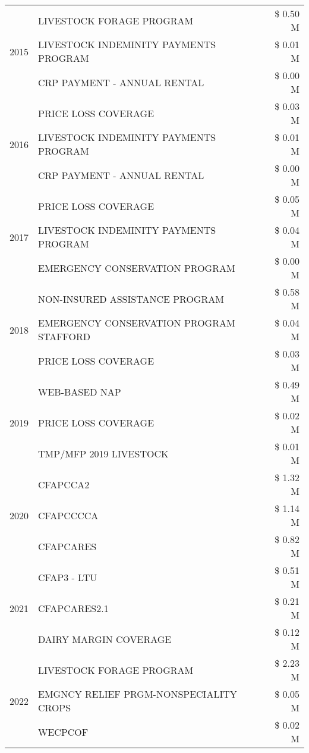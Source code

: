\begin{tabular}{llr}
\cline{1-3}
\multirow[t]{3}{*}{2015} & LIVESTOCK FORAGE PROGRAM & \$ 0.50 M \\
 & LIVESTOCK INDEMINITY PAYMENTS PROGRAM & \$ 0.01 M \\
 & CRP PAYMENT - ANNUAL RENTAL & \$ 0.00 M \\
\cline{1-3}
\multirow[t]{3}{*}{2016} & PRICE LOSS COVERAGE & \$ 0.03 M \\
 & LIVESTOCK INDEMINITY PAYMENTS PROGRAM & \$ 0.01 M \\
 & CRP PAYMENT - ANNUAL RENTAL & \$ 0.00 M \\
\cline{1-3}
\multirow[t]{3}{*}{2017} & PRICE LOSS COVERAGE & \$ 0.05 M \\
 & LIVESTOCK INDEMINITY PAYMENTS PROGRAM & \$ 0.04 M \\
 & EMERGENCY CONSERVATION PROGRAM & \$ 0.00 M \\
\cline{1-3}
\multirow[t]{3}{*}{2018} & NON-INSURED ASSISTANCE PROGRAM & \$ 0.58 M \\
 & EMERGENCY CONSERVATION PROGRAM STAFFORD & \$ 0.04 M \\
 & PRICE LOSS COVERAGE & \$ 0.03 M \\
\cline{1-3}
\multirow[t]{3}{*}{2019} & WEB-BASED NAP & \$ 0.49 M \\
 & PRICE LOSS COVERAGE & \$ 0.02 M \\
 & TMP/MFP 2019 LIVESTOCK & \$ 0.01 M \\
\cline{1-3}
\multirow[t]{3}{*}{2020} & CFAPCCA2 & \$ 1.32 M \\
 & CFAPCCCCA & \$ 1.14 M \\
 & CFAPCARES & \$ 0.82 M \\
\cline{1-3}
\multirow[t]{3}{*}{2021} & CFAP3 - LTU & \$ 0.51 M \\
 & CFAPCARES2.1 & \$ 0.21 M \\
 & DAIRY MARGIN COVERAGE & \$ 0.12 M \\
\cline{1-3}
\multirow[t]{3}{*}{2022} & LIVESTOCK FORAGE PROGRAM & \$ 2.23 M \\
 & EMGNCY RELIEF PRGM-NONSPECIALITY CROPS & \$ 0.05 M \\
 & WECPCOF & \$ 0.02 M \\
\cline{1-3}
\bottomrule
\end{tabular}
